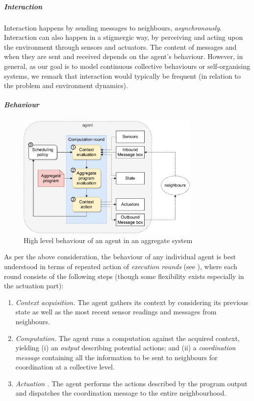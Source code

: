 \subparagraph*{Interaction}
%
Interaction happens by sending messages
 to neighbours, \emph{asynchronously}.
%
Interaction can also happen in a stigmergic way, 
 by perceiving and acting upon the environment through sensors and actuators.
%
The content of messages and when they are sent and received depends on the agent's behaviour.
%
However, in general, as our goal is to model continuous collective behaviours or self-organising systems,
 we remark that interaction would typically be frequent (in relation to the problem and environment dynamics).

\subparagraph{Behaviour}
\begin{figure}
    \centering
    \includegraphics[width=0.8\textwidth]{chapters/img/aggregate-agent-control-architecture.pdf}
    \caption{High level behaviour of an agent in an aggregate system}\label{fig:aggregate-agent-control-architecture}
\end{figure}
%
As per the above consideration,
 the behaviour of any individual agent is best understood
 in terms of repeated action of \emph{execution rounds} (see ), where each round consists of the following steps (though some flexibility exists especially in the actuation part):
%
\begin{enumerate}
\item \emph{Context acquisition.} The agent gathers its context by considering its previous state as well as the most recent sensor readings and messages from neighbours.
\item \emph{Computation.} The agent runs a computation against the acquired context, 
 yielding (i) an \emph{output} describing potential actions; 
 and (ii) a \emph{coordination message} containing all the information to be sent to neighbours for coordination at a collective level.
\item \emph{Actuation .} The agent performs the actions described by the program output and dispatches the coordination message to the entire neighbourhood.
\end{enumerate}
%

